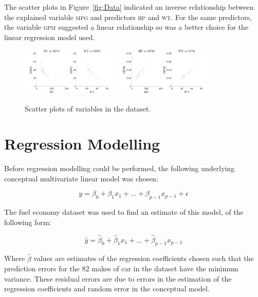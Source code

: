 \documentclass[a4paper,10pt,twocolumn]{article}
\newcommand{\MPG}{\textsc{mpg}\xspace}
\newcommand{\GPM}{\textsc{gpm}\xspace}
\newcommand{\HP}{\textsc{hp}\xspace}
\newcommand{\WT}{\textsc{wt}\xspace}
\begin{document}
The scatter plots in Figure~\vref{fig:Data} indicated an inverse relationship 
between the explained variable \MPG and predictors \HP and \WT. For the same 
predictors, the variable \GPM suggested a linear relationship so was a 
better choice for the linear regression model used.

\begin{figure}[h]
    \centering
    \includegraphics[width=0.42\textwidth]{MPG}
    \includegraphics[width=0.42\textwidth]{GPM}
    \caption{Scatter plots of variables in the dataset.}
    \label{fig:Data}
\end{figure}

\section{Regression Modelling}

Before regression modelling could be performed, the following underlying 
conceptual multivariate linear model was chosen:

\begin{equation}
    y = \beta_0 + \beta_1 x_1 + ... + \beta_{p-1}x_{p-1} + \epsilon
    \label{eq:Model}
\end{equation}

The fuel economy dataset was used to find an estimate of this model, of the 
following form:

\begin{equation}
    \hat{y} = \hat{\beta}_0 + \hat{\beta}_1 x_1 + ... + \hat{\beta}_{p-1}x_{p-1}
    \label{eq:Estimate}
\end{equation}

Where $\hat{\beta}$ values are estimates of the regression coefficients chosen 
such that the prediction errors for the 82 makes of car in the dataset have the 
minimum variance. These residual errors are due to errors in the estimation of 
the regression coefficients and random error in the conceptual model.
\end{document}
